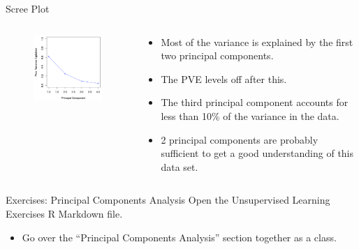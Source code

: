 \documentclass[
  ignorenonframetext,
  aspectratio=169,
]{beamer}
\providecommand{\tightlist}{%
  \setlength{\itemsep}{0pt}\setlength{\parskip}{0pt}}\usepackage{longtable,booktabs,array}
\begin{document}
\begin{frame}{Scree Plot}
\protect\hypertarget{scree-plot}{}
\begin{columns}[T]
\begin{column}{0.5\textwidth}
\begin{figure}

{\centering \includegraphics[width=2.71875in,height=\textheight]{images/scree_plot.png}

}

\end{figure}
\end{column}

\begin{column}{0.5\textwidth}
\begin{itemize}
\item
  Most of the variance is explained by the first two principal
  components.
\item
  The PVE levels off after this.
\item
  The third principal component accounts for less than 10\% of the
  variance in the data.
\item
  2 principal components are probably sufficient to get a good
  understanding of this data set.
\end{itemize}
\end{column}
\end{columns}
\end{frame}

\begin{frame}{Exercises: Principal Components Analysis}
\protect\hypertarget{exercises-principal-components-analysis}{}
Open the Unsupervised Learning Exercises R Markdown file.

\begin{itemize}
\tightlist
\item
  Go over the ``Principal Components Analysis'' section together as a
  class.
\end{itemize}
\end{frame}
\end{document}
